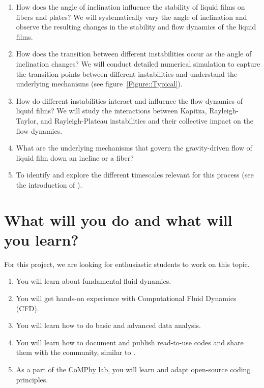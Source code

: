 \documentclass[11pt]{article}
\begin{document}
\begin{enumerate}
	\item How does the angle of inclination influence the stability of liquid films on fibers and plates? We will systematically vary the angle of inclination and observe the resulting changes in the stability and flow dynamics of the liquid films.
	
	\item How does the transition between different instabilities occur as the angle of inclination changes? We will conduct detailed numerical simulation to capture the transition points between different instabilities and understand the underlying mechanisms (see figure~\ref{Figure::Typical}). 
	
	\item How do different instabilities interact and influence the flow dynamics of liquid films? We will study the interactions between Kapitza, Rayleigh-Taylor, and Rayleigh-Plateau instabilities and their collective impact on the flow dynamics.
	
	\item What are the underlying mechanisms that govern the gravity-driven flow of liquid film down an incline or a fiber?
		
	\item To identify and explore the different timescales relevant for this process (see the introduction of \citet{VatsalThesis}).
\end{enumerate}

\section*{What will you do and what will you learn?}
For this project, we are looking for enthusiastic students to work on this topic.
\begin{enumerate}
\itemsep0em
\item You will learn about fundamental fluid dynamics.
\item You will get hands-on experience with Computational Fluid Dynamics (CFD).
\item You will learn how to do basic and advanced data analysis.
\item You will learn how to document and publish read-to-use codes and share them with the community, similar to \citet{basiliskVatsal, basiliskVatsalDropFilm, basiliskVatsalViscousBouncing}. 
\item As a part of the \href{https://comphy-lab.org}{CoMPhy lab}, you will learn and adapt open-source coding principles. 

\end{enumerate}
\end{document}
